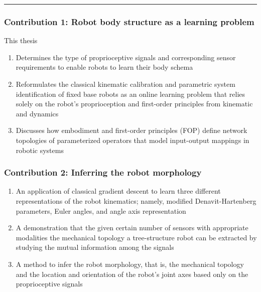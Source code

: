 \documentclass[12pt, a4paper]{article}
\begin{document}
\hrule

\subsubsection*{Contribution 1: Robot body structure as a learning problem}
This thesis
\begin{enumerate}
	\item Determines the type of proprioceptive signals and corresponding sensor requirements to enable robots to learn their body schema	
	\item Reformulates the classical kinematic calibration and parametric system identification of fixed base robots as an online learning problem that relies solely on the robot's proprioception and first-order principles from kinematic and dynamics 
	\item Discusses how embodiment and first-order principles (FOP) define network topologies of parameterized operators that model input-output mappings in robotic systems
\end{enumerate}

\subsubsection*{Contribution 2: Inferring the robot morphology}
\begin{enumerate}
	\item An application of classical gradient descent to learn three different representations of the robot kinematics; namely, modified Denavit-Hartenberg parameters, Euler angles, and angle axis representation
	\item A demonstration that the given certain number of sensors with appropriate modalities the mechanical topology a tree-structure robot can be extracted by studying the mutual information among the signals
	\item A method to infer the robot morphology, that is, the mechanical topology and the location and orientation of the robot's joint axes based only on the proprioceptive signals

\end{enumerate}
\end{document}
